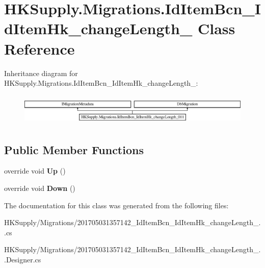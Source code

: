 \hypertarget{class_h_k_supply_1_1_migrations_1_1_id_item_bcn___id_item_hk__change_length__011}{}\section{H\+K\+Supply.\+Migrations.\+Id\+Item\+Bcn\+\_\+\+Id\+Item\+Hk\+\_\+change\+Length\+\_ Class Reference}
\label{class_h_k_supply_1_1_migrations_1_1_id_item_bcn___id_item_hk__change_length__011}
Inheritance diagram for H\+K\+Supply.\+Migrations.\+Id\+Item\+Bcn\+\_\+\+Id\+Item\+Hk\+\_\+change\+Length\+\_\+:\begin{figure}[H]
\begin{center}
\leavevmode
\includegraphics[height=1.530055cm]{class_h_k_supply_1_1_migrations_1_1_id_item_bcn___id_item_hk__change_length__011}
\end{center}
\end{figure}
\subsection*{Public Member Functions}
\begin{DoxyCompactItemize}
\item 
\mbox{\label{class_h_k_supply_1_1_migrations_1_1_id_item_bcn___id_item_hk__change_length__011_a4deea3d45119e7df403fc7fd1968c7f3}} 
override void {\bfseries Up} ()
\item 
\mbox{\label{class_h_k_supply_1_1_migrations_1_1_id_item_bcn___id_item_hk__change_length__011_a000ce1ef0f5bf0cc3109d04c21c63de3}} 
override void {\bfseries Down} ()
\end{DoxyCompactItemize}


The documentation for this class was generated from the following files\+:\begin{DoxyCompactItemize}
\item 
H\+K\+Supply/\+Migrations/201705031357142\+\_\+\+Id\+Item\+Bcn\+\_\+\+Id\+Item\+Hk\+\_\+change\+Length\+\_..\+cs\item 
H\+K\+Supply/\+Migrations/201705031357142\+\_\+\+Id\+Item\+Bcn\+\_\+\+Id\+Item\+Hk\+\_\+change\+Length\+\_..\+Designer.\+cs\end{DoxyCompactItemize}
